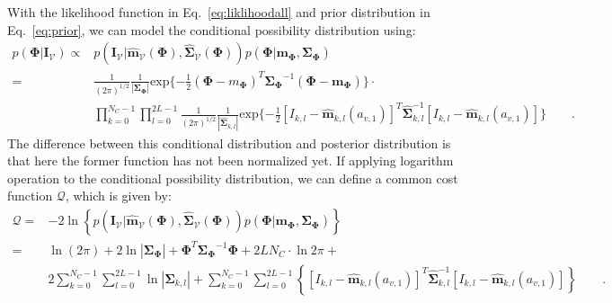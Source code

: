 With the likelihood function in Eq.~\ref{eq:liklihoodall} and prior distribution in
Eq.~\ref{eq:prior}, we can model the conditional possibility distribution using:
\begin{align}
\label{eq:costf}
    p(\mathbf{\Phi}|\mathbf{\mathbf{I}}_{\mathcal{V}}) 
    \propto &
    p(\mathbf{\mathbf{I}_{\mathcal{V}}}
    |\hat{\mathbf{\mathbf{m}}}_{\mathcal{V}}(\mathbf{\Phi}),\hat{\mathbf{\mathbf{\Sigma}}}_{\mathcal{V}}(\mathbf{\Phi}))p(\mathbf{\Phi}
    | \mathbf{m}_{\mathbf{\Phi}},
    \mathbf{\mathbf{\Sigma}}_{\mathbf{\Phi}})\nonumber\\
    = & {\frac{1}{{(2\pi)}^{1/2}}}
      \frac{1}{|\mathbf{\Sigma}_{\mathbf{\Phi}}|}
      \mathrm{exp}\{-\frac{1}{2}{(\mathbf{\Phi}-m_{\mathbf{\Phi}})^T{\mathbf{\Sigma}_{\mathbf{\Phi}}}^{-1}(\mathbf{\Phi}-\mathbf{m}_{\mathbf{\Phi}})}\}\cdot
    \nonumber\\ 
    & \prod_{k = 0}^{N_{C}-1} \prod_{l=0}^{2L-1}{\frac{1}{(2\pi)^{1/2}}
        \frac{1}{|\hat{\mathbf{\Sigma}}_{k,l}|} \mathrm{exp}\{-\frac{1}{2}
        {\left[I_{k,l}-\hat{\mathbf{m}}_{k,l}(a_{v,1})\right]^T\hat{\mathbf{\Sigma}}_{k,l}^{-1}\left[I_{k,l}-\hat{\mathbf{m}}_{k,l}(a_{v,1})\right]}
      }\}\qquad.
\end{align}
The difference between this conditional distribution and posterior
distribution is that here the former function has not been normalized yet.
If applying logarithm operation to the conditional possibility
distribution, we can define a common cost function $\mathcal{Q}$,
which is given by:
\begin{align}
  \label{eq:costd}
  \mathcal{Q} = & -2 \ln \left\{  p(\mathbf{\mathbf{I}_{\mathcal{V}}}
    |\hat{\mathbf{\mathbf{m}}}_{\mathcal{V}}(\mathbf{\Phi}),\hat{\mathbf{\mathbf{\Sigma}}}_{\mathcal{V}}(\mathbf{\Phi}))p(\mathbf{\Phi}
    | \mathbf{m}_{\mathbf{\Phi}},
    \mathbf{\mathbf{\Sigma}}_{\mathbf{\Phi}})\right\}\nonumber\\
 = & \ln{(2\pi)} + 2\ln{|\mathbf{\Sigma}_{\mathbf{\Phi}}|} +
 {\mathbf{\Phi}}^T{\mathbf{\Sigma}_{\mathbf{\Phi}}}^{-1}\mathbf{\Phi}
 + 2LN_{C} \cdot \ln{2\pi} + \nonumber \\
& 2\sum_{k = 0}^{N_{C}-1} \sum_{l=0}^{2L-1}{\ln{|\mathbf{\Sigma}_{k,l}|}} + \sum_{k = 0}^{N_{C}-1} \sum_{l=0}^{2L-1}
\left\{{\left[I_{k,l}-\hat{\mathbf{m}}_{k,l}(a_{v,1})\right]^T\hat{\mathbf{\Sigma}}_{k,l}^{-1}\left[I_{k,l}-\hat{\mathbf{m}}_{k,l}(a_{v,1})\right]}\right\}\qquad.
\end{align}

